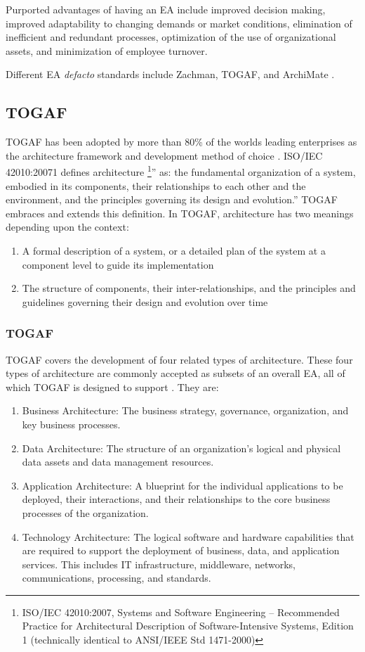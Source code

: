 \documentclass[12pt,a4paper,final,twoside,onecolumn,titlepage]{book}
\begin{document}
Purported advantages of having an \gls{EA} include improved decision making, improved adaptability to changing demands or market conditions, elimination of inefficient and redundant processes, optimization of the use of organizational assets, and minimization of employee turnover.

Different \gls{EA} \textit{defacto} standards include Zachman, TOGAF, and ArchiMate \cite{ES01}.

\subsection {TOGAF}
TOGAF has been adopted by more than 80\% of the worlds leading enterprises as the architecture framework and development method of choice \cite{ES06}. \gls{ISO/IEC} 42010:20071 defines architecture \footnote{\gls{ISO/IEC} 42010:2007, Systems and Software Engineering – Recommended Practice for Architectural Description of Software-Intensive Systems, Edition 1 (technically identical to \gls{ANSI/IEEE} Std 1471-2000)}” as: the fundamental organization of a system, embodied in its components, their relationships to each other and the environment, and the principles governing its design and evolution.”
TOGAF embraces and extends this definition. In TOGAF, architecture has two meanings depending upon the context:
\begin{enumerate}
\item A formal description of a system, or a detailed plan of the system at a component level to guide its implementation
\item The structure of components, their inter-relationships, and the principles and guidelines governing their design and evolution over time
\end{enumerate}
\subsubsection{TOGAF}
TOGAF covers the development of four related types of architecture. These four types of architecture are commonly accepted as subsets of an overall \gls{EA}, all of which TOGAF is designed to support \cite{ES07}. They are:
\begin{enumerate}
\item Business Architecture: The business strategy, governance, organization, and key business processes.
\item Data Architecture: The structure of an organization's logical and physical data assets and data management resources.
\item Application Architecture: A blueprint for the individual applications to be deployed, their interactions, and their relationships to the core business processes of the organization.
\item Technology Architecture: The logical software and hardware capabilities that are required to support the deployment of business, data, and application services. This includes IT infrastructure, middleware, networks, communications, processing, and standards.
\end{enumerate}
\end{document}
